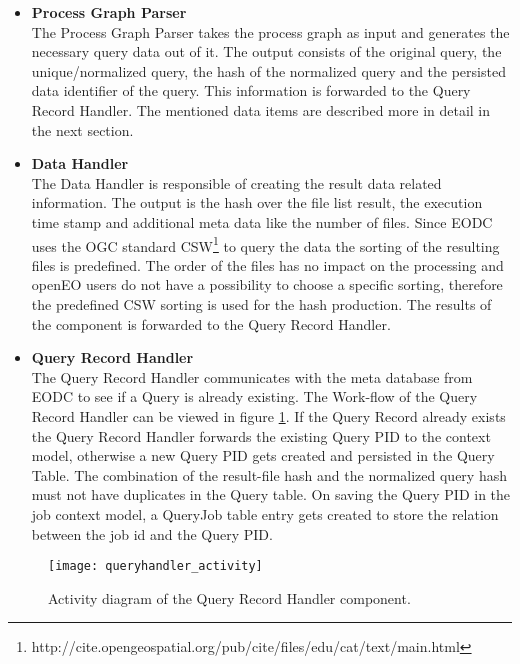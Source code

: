 \documentclass[draft,final]{vutinfth} %
\begin{document}
 \begin{itemize}
	\item \textbf{Process Graph Parser} \\
	The Process Graph Parser takes the process graph as input and generates the necessary query data out of it. The output consists of the original query, the unique/normalized query, the hash of the normalized query and the persisted data identifier of the query. This information is forwarded to the Query Record Handler. The mentioned data items are described more in detail in the next section.  
	\item \textbf{Data Handler} \\ 
	The Data Handler is responsible of creating the result data related information. The output is the hash over the file list result, the execution time stamp and additional meta data like the number of files. Since EODC uses the OGC standard CSW\footnote{http://cite.opengeospatial.org/pub/cite/files/edu/cat/text/main.html} to query the data the sorting of the resulting files is predefined. The order of the files has no impact on the processing and openEO users do not have a possibility to choose a specific sorting, therefore the predefined CSW sorting is used for the hash production. The results of the component is forwarded to the Query Record Handler.    
	\item \textbf{Query Record Handler} \\
	The Query Record Handler communicates with the meta database from EODC to see if a Query is already existing. The Work-flow of the Query Record Handler can be viewed in figure \ref{fig:queryhandler_activity}. If the Query Record already exists the Query Record Handler forwards the existing Query PID to the context model, otherwise a new Query PID gets created and persisted in the Query Table. The combination of the result-file hash and the normalized query hash must not have duplicates in the Query table. On saving the Query PID in the job context model, a QueryJob table entry gets created to store the relation between the job id and the Query PID. 
	
\end{itemize}

\begin{figure}[h]
	\centering
	\texttt{[image: queryhandler\_activity]}
	\caption{Activity diagram of the Query Record Handler component.}
	\label{fig:queryhandler_activity} %
\end{figure}
\end{document}
